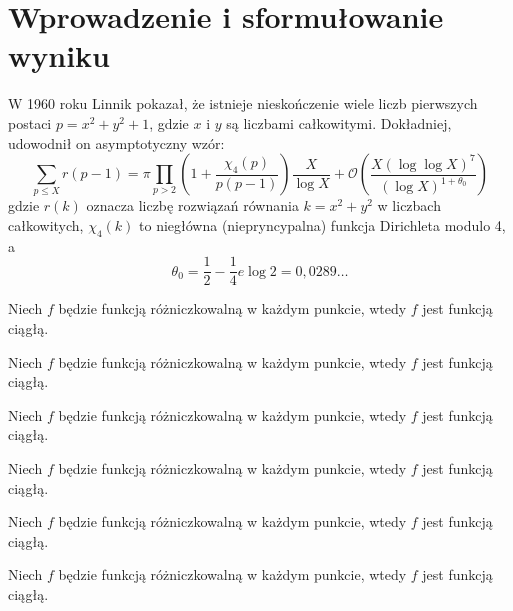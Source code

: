 
\section{Wprowadzenie i sformułowanie wyniku}
W 1960 roku Linnik pokazał, że istnieje nieskończenie wiele liczb pierwszych postaci $p = x^2 + y^2 + 1$,
gdzie $x$ i $y$ są liczbami całkowitymi.
Dokładniej, udowodnił on asymptotyczny wzór:
%
\begin{equation*}
  \sum_{p \leq X}{r(p - 1)}
    =
  \pi \prod_{p > 2}
  \left(
    1 + \frac{\chi_4(p)}{p(p - 1)}
  \right)
  \frac{X}{\log X}
    +
  \mathcal{O}
  \left(
    \frac{X (\log \log X)^7}{(\log X)^{1 + \theta_0}}
  \right)
\end{equation*}
%
gdzie $r(k)$ oznacza liczbę rozwiązań równania $k = x^2 + y^2$ w liczbach całkowitych,
$\chi_4(k)$ to niegłówna (niepryncypalna) funkcja Dirichleta modulo 4, a
%
\begin{equation}
  \theta_0 = \frac{1}{2} - \frac{1}{4} e \log 2 = 0{,}0289 \dots
\end{equation}

\begin{theorem}
  Niech $f$ będzie funkcją różniczkowalną w każdym punkcie,
  wtedy $f$ jest funkcją ciągłą.
\end{theorem}

\begin{definition}
  Niech $f$ będzie funkcją różniczkowalną w każdym punkcie,
  wtedy $f$ jest funkcją ciągłą.
\end{definition}

\begin{lemma}
  Niech $f$ będzie funkcją różniczkowalną w każdym punkcie,
  wtedy $f$ jest funkcją ciągłą.
\end{lemma}

\begin{proposition}
  Niech $f$ będzie funkcją różniczkowalną w każdym punkcie,
  wtedy $f$ jest funkcją ciągłą.
\end{proposition}

\begin{corollary}
  Niech $f$ będzie funkcją różniczkowalną w każdym punkcie,
  wtedy $f$ jest funkcją ciągłą.
\end{corollary}

\begin{remark}
  Niech $f$ będzie funkcją różniczkowalną w każdym punkcie,
  wtedy $f$ jest funkcją ciągłą.
\end{remark}

